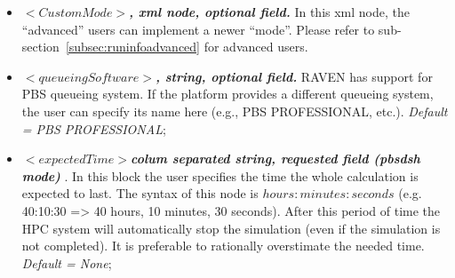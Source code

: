 \begin{itemize}
\item $<CustomMode>$\textbf{\textit{, xml node, optional field.}} In this xml node, the ``advanced'' users can implement a newer ``mode''. Please refer to sub-section~\ref{subsec:runinfoadvanced} for advanced users.

\item $<queueingSoftware>$\textbf{\textit{, string, optional field.}} RAVEN has support for PBS queueing system. If the platform provides a different queueing system, the user can specify its name here (e.g., PBS PROFESSIONAL, etc.). \textit{Default = PBS PROFESSIONAL};

\item $<expectedTime>$\textbf{\textit{colum separated string, requested field (pbsdsh mode) }}. In this block the user specifies the time the whole calculation is expected to last. The syntax of this node is $hours:minutes:seconds$ (e.g. 40:10:30 => 40 hours, 10 minutes, 30 seconds). After this period of time the HPC system will automatically stop the simulation (even if the simulation is not completed). It is preferable to rationally overstimate the needed time. \textit{Default = None};
\end{itemize}

